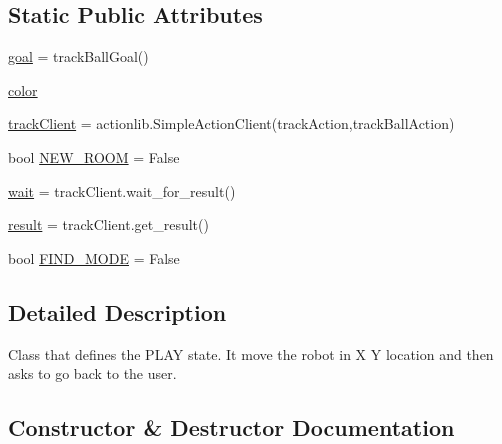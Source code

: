 \subsection*{Static Public Attributes}
\begin{DoxyCompactItemize}
\item 
\hyperlink{classcommandManager_1_1Track_aaf31135bbe355747fc8e8ebbfa9ea7c3}{goal} = track\+Ball\+Goal()
\item 
\hyperlink{classcommandManager_1_1Track_acaaf54b9a806780342efd702c43ca892}{color}
\item 
\hyperlink{classcommandManager_1_1Track_a4a57e4e548d9213c4623f5d528753b1f}{track\+Client} = actionlib.\+Simple\+Action\+Client(\textquotesingle{}track\+Action\textquotesingle{},track\+Ball\+Action)
\item 
bool \hyperlink{classcommandManager_1_1Track_afb7ce9aacf03e990b6ecca9c7641caeb}{N\+E\+W\+\_\+\+R\+O\+OM} = False
\item 
\hyperlink{classcommandManager_1_1Track_a8f86bbb5fd3d92749c09d5e876a1d1a6}{wait} = track\+Client.\+wait\+\_\+for\+\_\+result()
\item 
\hyperlink{classcommandManager_1_1Track_aa66fb1baab2433c729df0919ba0989a7}{result} = track\+Client.\+get\+\_\+result()
\item 
bool \hyperlink{classcommandManager_1_1Track_af7f0cd8d298db357c98855ffd93eff1b}{F\+I\+N\+D\+\_\+\+M\+O\+DE} = False
\end{DoxyCompactItemize}


\subsection{Detailed Description}
\begin{DoxyVerb}Class that defines the PLAY state. 
 It move the robot in X Y location and then asks to go back to the user.\end{DoxyVerb}
 

\subsection{Constructor \& Destructor Documentation}
